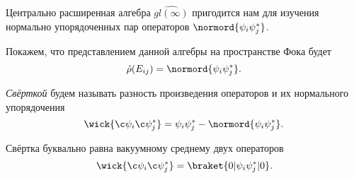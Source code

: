 \documentclass[a4paper,14pt]{extarticle}
\numberwithin{equation}{section}
\begin{document}
Центрально расширенная алгебра $\widehat{gl(\infty)}$ пригодится нам для изучения нормально упорядоченных пар операторов
$\normord{\psi_i \psi_j^*}$.

Покажем, что представлением данной
алгебры на пространстве Фока будет
\begin{equation}
	\hat{\rho}(E_{ij})= \normord{\psi_i \psi_j^*}
.\end{equation} 
\begin{dfn*}
\emph{Свёрткой} будем называть разность произведения операторов
и их нормального упорядочения
\begin{equation}
	\wick{\c\psi_i \c\psi_j^*}=\psi_i \psi_j^*-
	\normord{\psi_i \psi_j^*}
	\label{}
.\end{equation}
\end{dfn*}
\begin{stm*}
Свёртка буквально равна вакуумному среднему двух операторов
\begin{equation}
	\wick{\c\psi_i \c\psi_j^*}=\braket{0 | \psi_i \psi_j^*| 0}
.\end{equation}
\end{stm*}
\end{document}
